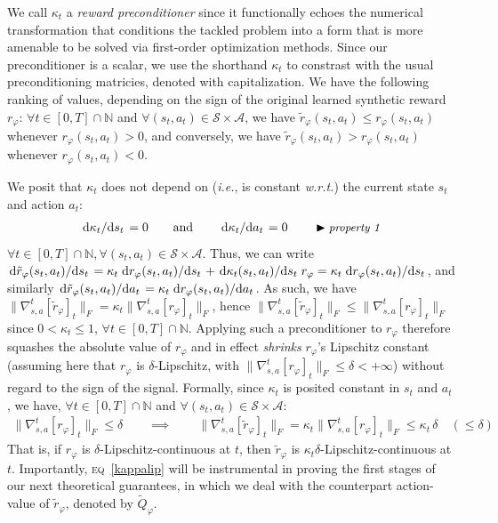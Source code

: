 We call $\kappa_t$ a \emph{reward preconditioner} since it functionally echoes the numerical transformation
that conditions the tackled problem into a form that is more amenable to be solved via first-order optimization methods.
Since our preconditioner is a scalar,
we use the shorthand $\kappa_t$ to constrast with the usual preconditioning matricies,
denoted with capitalization.
We have the following ranking of values,
depending on the sign of the original learned synthetic reward $r_\varphi$:
$\forall t \in [0, T] \cap \mathbb{N}$ and
$\forall (s_t, a_t) \in \mathcal{S} \times \mathcal{A}$,
we have $\tilde{r}_\varphi (s_t,a_t) \leq r_\varphi (s_t,a_t)$ whenever $r_\varphi (s_t,a_t) > 0$,
and conversely,
we have $\tilde{r}_\varphi (s_t,a_t) > r_\varphi (s_t,a_t)$ whenever $r_\varphi (s_t,a_t) < 0$.

We posit that $\kappa_t$ does not depend on
(\textit{i.e.}, is constant \textit{w.r.t.})
the current state $s_t$ and action $a_t$:
\begin{align}
\dv*{\kappa_t}{s_t} = 0
\qquad \text{and} \qquad
\dv*{\kappa_t}{a_t} = 0
\qquad
\blacktriangleright\text{\small{\textit{property 1}}}
\label{purplenopresent}
\end{align}
$\forall t \in [0, T] \cap \mathbb{N},
\forall (s_t, a_t) \in \mathcal{S} \times \mathcal{A}$.
Thus, we can write
$\dv*{\tilde{r}_\varphi (s_t, a_t)}{s_t}
= \kappa_t \dv*{r_\varphi (s_t, a_t)}{s_t}
+ \dv*{\kappa_t (s_t, a_t)}{s_t} r_\varphi
= \kappa_t \dv*{r_\varphi (s_t, a_t)}{s_t}$,
and similarly
$\dv*{\tilde{r}_\varphi (s_t, a_t)}{a_t}
= \kappa_t \dv*{r_\varphi (s_t, a_t)}{a_t}$.
As such, we have
$\lVert \nabla_{s,a}^t[\tilde{r}_\varphi]_t \rVert _F
= \kappa_t \lVert \nabla_{s,a}^t[r_\varphi]_t \rVert _F$,
hence
$\lVert \nabla_{s,a}^t[\tilde{r}_\varphi]_t \rVert _F
\leq \lVert \nabla_{s,a}^t[r_\varphi]_t \rVert _F$
since $0 < \kappa_t \leq 1$, $\forall t \in [0, T] \cap \mathbb{N}$.
Applying such a preconditioner to $r_\varphi$ therefore squashes the absolute value of $r_\varphi$
and in effect \emph{shrinks} $r_\varphi$'s Lipschitz constant
(assuming here that $r_\varphi$ is $\delta$-Lipschitz, with
$\lVert \nabla_{s,a}^t[r_\varphi]_t \rVert _F \leq \delta < +\infty$)
without regard to the sign of the signal.
Formally, since $\kappa_t$ is posited constant in $s_t$ and $a_t$, we have,
$\forall t \in [0, T] \cap \mathbb{N}$
and $\forall (s_t, a_t) \in \mathcal{S} \times \mathcal{A}$:
\begin{align}
\lVert \nabla_{s,a}^t[r_\varphi]_t \rVert _F \leq \delta
\qquad \implies \qquad
\lVert \nabla_{s,a}^t[\tilde{r}_\varphi]_t \rVert _F
= \kappa_t \lVert \nabla_{s,a}^t[r_\varphi]_t \rVert _F
\leq \kappa_t \, \delta
\quad (\leq \delta)
\label{kappalip}
\end{align}
That is, if $r_\varphi$ is $\delta$-Lipschitz-continuous at $t$, then $\tilde{r}_\varphi$
is $\kappa_t \delta$-Lipschitz-continuous at $t$.
Importantly,
\textsc{eq}~\ref{kappalip} will be instrumental in proving the first stages of
our next theoretical guarantees,
in which we deal with the counterpart action-value of $\tilde{r}_\varphi$, denoted by $\widetilde{Q}_\varphi$.

